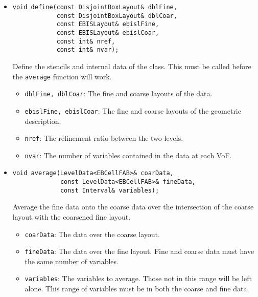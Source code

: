 \begin{itemize}
\item \begin{small}\begin{verbatim}
void define(const DisjointBoxLayout& dblFine,
            const DisjointBoxLayout& dblCoar,
            const EBISLayout& ebislFine,
            const EBISLayout& ebislCoar,
            const int& nref,
            const int& nvar);        
\end{verbatim}\end{small}
Define the stencils and internal data of the class.  This
must be called before the {\tt average} function will work. 

\begin{itemize}
\item {\tt dblFine, dblCoar}: The fine and coarse layouts
        of the data.
\item {\tt ebislFine, ebislCoar}: The fine and coarse layouts
        of the geometric description.
\item {\tt nref}: The refinement ratio between the two levels.
\item {\tt nvar}: The number of variables contained in the data
        at each VoF.
\end{itemize}

\item \begin{small}\begin{verbatim}
void average(LevelData<EBCellFAB>& coarData,
             const LevelData<EBCellFAB>& fineData,
             const Interval& variables);            
\end{verbatim}\end{small}
Average the fine data onto the coarse data over the intersection
of the coarse layout with the coarsened fine layout. 

\begin{itemize}
\item {\tt coarData}: The data over the coarse layout.
\item {\tt fineData}: The data over the fine layout.  
        Fine and coarse data must
        have the same number of variables.
\item {\tt variables}:  The variables to average.  Those not
        in this range will be left alone.   This range of variables
        must be in both the coarse and fine data.
\end{itemize}
\end{itemize}

